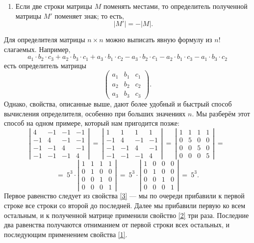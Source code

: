 \documentclass{article}
\begin{document}
\begin{enumerate}[resume]
 \item 
Если две строки матрицы $M$ поменять местами, то определитель полученной матрицы $M'$ поменяет знак; то есть,
\[|M'|=-|M|.\]
\end{enumerate}


Для определителя матрицы $n\times n$ можно выписать явную формулу из $n!$ слагаемых. 
Например, 
\[
a_1{\cdot} b_2{\cdot} c_3+a_2{\cdot} b_3{\cdot} c_1+a_3{\cdot} b_1{\cdot} c_2-a_3{\cdot} b_2{\cdot} c_1-a_2{\cdot} b_1{\cdot} c_3-a_1{\cdot} b_3{\cdot} c_2\]
есть определитель матрицы
\[\left(
\begin{matrix}
a_1&b_1&c_1
\\
a_2&b_2&c_2
\\
a_3&b_3&c_3
\end{matrix}
\right).\]
Однако, свойства, описанные выше, дают более удобный и быстрый способ вычисления определителя, особенно при больших значениях $n$.
Мы разберём этот способ на одном примере, который нам пригодится позже:
\[\left|
\begin{matrix}
4&-1&-1&-1
\\
-1&4&-1&-1
\\
-1&-1&4&-1
\\
-1&-1&-1&4
\end{matrix}
\right|
\ 
=
\ 
\left|
\begin{matrix}
1&1&1&1
\\
-1&4&-1&-1
\\
-1&-1&4&-1
\\
-1&-1&-1&4
\end{matrix}
\right|
\ 
=
\ 
\left|
\begin{matrix}
1&1&1&1
\\
0&5&0&0
\\
0&0&5&0
\\
0&0&0&5
\end{matrix}
\right|
\ 
=
\ 
\]
\[
=\ 
5^3\cdot
\left|
\begin{matrix}
1&1&1&1
\\
0&1&0&0
\\
0&0&1&0
\\
0&0&0&1
\end{matrix}
\right|\ =\ 
5^3\cdot\left|
\begin{matrix}
1&0&0&0
\\
0&1&0&0
\\
0&0&1&0
\\
0&0&0&1
\end{matrix}
\right|
\ =\ 5^3.\]
Первое равенство следует из свойства \ref{3} --- мы по очереди прибавили к первой строке все строки со второй до последней. 
Далее мы прибавили первую ко всем остальным, и к полученной матрице применили свойство \ref{2} три раза.
Последние два равенства получаются отниманием от первой строки всех остальных, и последующим применением свойства \ref{1}.
\end{document}

